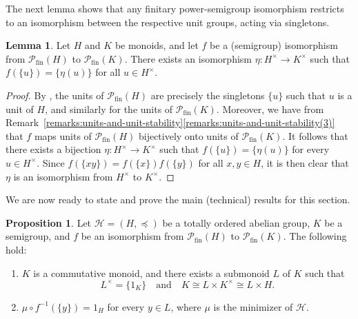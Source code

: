 \documentclass[11pt,reqno]{amsart}
\theoremstyle{definition}
\newtheorem{proposition}[theorem]{Proposition}
\newtheorem{lemma}[theorem]{Lemma}
\theoremstyle{remark}
\theoremstyle{theoremdd}
\newcommand{\fin}{\mathrm{fin}}
\renewcommand{\,}{\kern 0.1em}
\begin{document}
The next lemma shows that any finitary power-semigroup isomorphism restricts to an isomorphism between the respective unit groups, acting via singletons.

\begin{lemma}
\label{lem:unit-reconstruction}
Let $H$ and $K$ be monoids, and let $f$ be a (semigroup) isomorphism from $\mathcal P_\fin(H)$ to $\mathcal P_\fin(K)$. There exists an isomorphism $\eta: H^\times \to K^\times$ such that $f(\{u\}) = \{\eta(u)\}$ for all $u \in H^\times$.
\end{lemma}

\begin{proof}
By \cite[Theorem~4.2(i)]{Tri-Survey}, the units of
$\mathcal P_\fin(H)$ are precisely the singletons $\{u\}$ such that
$u$ is a unit of $H$, and similarly for the units of
$\mathcal P_\fin(K)$. Moreover, we have from
Remark~\ref{remarks:units-and-unit-stability}\ref{remarks:units-and-unit-stability(3)} that $f$ maps units of
$\mathcal P_\fin(H)$ bijectively onto units of
$\mathcal P_\fin(K)$. It follows that there exists a bijection $\eta \colon H^\times \to \allowbreak K^\times$ such that $f(\{u\}) = \{\eta(u)\}$ for every $u \in H^\times$. 
Since $f(\{xy\}) = f(\{x\}) f(\{y\})$ for all $x, y \in H$, it is then clear that $\eta$ is an isomorphism from $H^\times$ to $K^\times$.
\end{proof}




We are now ready to state and prove the main (technical) results for this section.

\begin{proposition}
\label{prop:structural-splitting}
Let $\mathcal H = (H, \preceq)$ be a totally ordered abelian group, $K$ be a semigroup, and $f$ be an isomorphism from $\mathcal P_\fin(H)$ to $\mathcal P_\fin(K)$. The following hold: 
\begin{enumerate}[label=\textup{(\roman{*})}]
\item\label{prop:structural-splitting(i)}
$K$ is a commutative monoid, and there exists a submonoid $L$ of $K$ such that 
\begin{equation}
\label{prop:structural-splitting:eq(0)}
L^\times = \{1_K\}
\quad\text{and}\quad
K \cong L \times K^\times \cong L \times H.
\end{equation}
\item\label{prop:structural-splitting(ii)} $\mu \circ f^{-1}(\{y\}) = 1_H$ for every $y \in L$, where $\mu$ is the minimizer of $\mathcal H$.
\end{enumerate}
\end{proposition}
\end{document}
